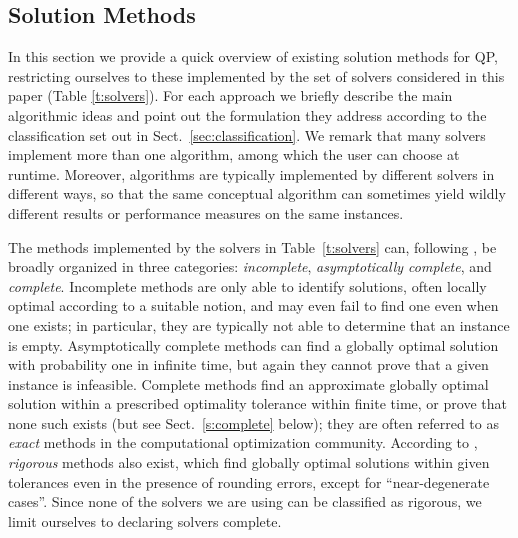 
\subsection{Solution Methods}\label{sec:algo}

In this section we provide a quick overview of existing solution methods for QP, restricting ourselves to these implemented by the set of solvers considered in this paper (Table \ref{t:solvers}). For each approach we briefly describe the main algorithmic ideas and point out the formulation they address according to the classification set out in Sect.~\ref{sec:classification}. We remark that many solvers implement more than one algorithm, among which the user can choose at runtime. Moreover, algorithms are typically implemented by different solvers in different ways, so that the same conceptual algorithm can sometimes yield wildly different results or performance measures on the same instances.


The methods implemented by the solvers in Table~\ref{t:solvers} can, following \cite{neumaier}, be broadly organized in three categories: {\it incomplete}, {\it asymptotically complete}, and {\it complete}. Incomplete methods are only able to identify solutions, often locally optimal according to a suitable notion, and may even fail to find one even when one exists; in particular, they are typically not able to determine that an instance is empty. Asymptotically complete methods can find a globally optimal solution with probability one in infinite time, but again they cannot prove that a given instance is infeasible. Complete methods find an approximate globally optimal solution within a prescribed optimality tolerance within finite time, or prove that none such exists (but see Sect.~\ref{s:complete} below); they are often referred to as \emph{exact} methods in the computational optimization community. According to \cite{neumaier}, {\it rigorous} methods also exist, which find globally optimal solutions within given tolerances even in the presence of rounding errors, except for ``near-degenerate cases''. Since none of the solvers we are using can be classified as rigorous, we limit ourselves to declaring solvers complete.

